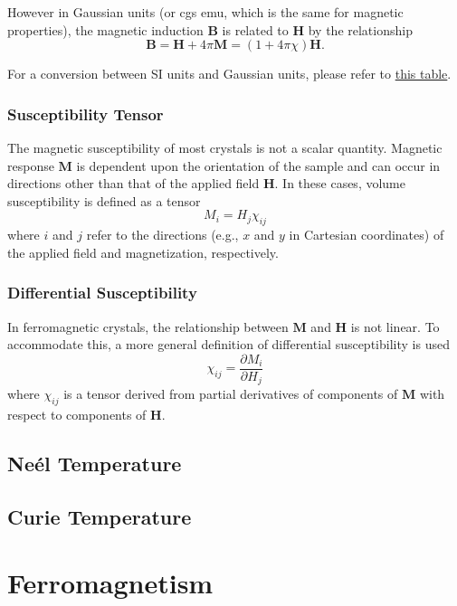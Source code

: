 \documentclass[11pt]{book} %
\begin{document}
However in Gaussian units (or cgs emu, which is the same for magnetic properties), the magnetic induction $\mathbf{B}$ is related to $\mathbf{H}$ by the relationship
\begin{equation}
\mathbf{B} = \mathbf{H} + 4\pi \mathbf{M} = (1+4\pi\chi)\mathbf{H}.
\end{equation}

For a conversion between SI units and Gaussian units, please refer to \href{https://www.qdusa.com/sitedocs/UnitsChart.pdf}{this table}.

\subsubsection{Susceptibility Tensor}
The magnetic susceptibility of most crystals is not a scalar quantity. Magnetic response $\mathbf{M}$ is dependent upon the orientation of the sample and can occur in directions other than that of the applied field $\mathbf{H}$. In these cases, volume susceptibility is defined as a tensor
\begin{equation}
{M}_{i} = {H}_{j} \chi_{ij}
\end{equation}
where $i$ and $j$ refer to the directions (e.g., $x$ and $y$ in Cartesian coordinates) of the applied field and magnetization, respectively.

\subsubsection{Differential Susceptibility}
In ferromagnetic crystals, the relationship between $\mathbf{M}$ and $\mathbf{H}$ is not linear. To accommodate this, a more general definition of differential susceptibility is used
\begin{equation}
\chi_{ij}=\frac{\partial M_{i}}{\partial H_{j}}
\end{equation}
where $\chi_{ij}$ is a tensor derived from partial derivatives of components of $\mathbf{M}$ with respect to components of $\mathbf{H}$. 

\subsection{Ne\'{e}l Temperature}

\subsection{Curie Temperature}

\section{Ferromagnetism}
\end{document}
